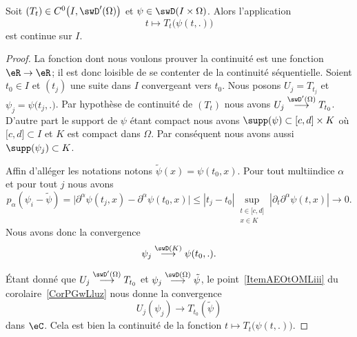 \begin{proposition} \label{PropOTlWzog}
    Soit \( (T_t)\in C^0\big( I,\swD'(\Omega) \big)\) et \( \psi\in\swD(I\times \Omega)\). Alors l'application
    \begin{equation}
        t\mapsto T_t\big( \psi(t,.) \big)
    \end{equation}
    est continue sur \( I\).
\end{proposition}

\begin{proof}
    La fonction dont nous voulons prouver la continuité est une fonction \( \eR\to\eR\); il est donc loisible de se contenter de la continuité séquentielle. Soient \( t_0\in I\) et \( (t_j)\) une suite dans \( I\) convergeant vers \( t_0\). Nous posons \( U_j=T_{t_j}\) et \( \psi_j=\psi\big( t_j,. \big)\). Par hypothèse de continuité de \( (T_t)\) nous avons \( U_j\stackrel{\swD'(\Omega)}{\longrightarrow}T_{t_0}\). D'autre part le support de \( \psi\) étant compact nous avons \( \supp(\psi)\subset \mathopen[ c , d \mathclose]\times K\) où \( \mathopen[ c , d \mathclose]\subset I\) et \( K\) est compact dans \( \Omega\). Par conséquent nous avons aussi \( \supp(\psi_j)\subset K\).

    Affin d'alléger les notations notons \( \tilde \psi(x)=\psi(t_0,x)\). Pour tout multiindice \( \alpha\) et pour tout \( j\) nous avons
    \begin{equation}
        p_{\alpha}(\psi_i-\tilde \psi)=\Big|  \partial^{\alpha}\psi(t_j,x)-\partial^{\alpha}\psi(t_0,x)    \Big|\leq | t_j-t_0 |\sup_{\substack{t\in\mathopen[ c , d \mathclose]\\x\in K}}| \partial_t\partial^{\alpha}\psi(t,x) |\to 0.
    \end{equation}
    Nous avons donc la convergence
    \begin{equation}
        \psi_j\stackrel{\swD(K)}{\longrightarrow}\psi(t_0,.).
    \end{equation}

    Étant donné que \( U_j\stackrel{\swD'(\Omega)}{\longrightarrow}T_{t_0}\) et \( \psi_j\stackrel{\swD(\Omega)}{\longrightarrow}\tilde \psi\), le point~\ref{ItemAEOtOMLiii} du corolaire~\ref{CorPGwLluz} nous donne la convergence
    \begin{equation}
        U_j(\psi_j)\to T_{t_0}(\tilde \psi)
    \end{equation}
    dans \( \eC\). Cela est bien la continuité de la fonction \( t\mapsto T_t\big( \psi(t,.) \big)\).
\end{proof}


